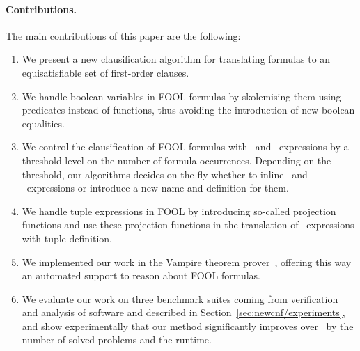 
\paragraph{Contributions.} The main contributions of this paper are the following:
\begin{enumerate}
  \item We present a new clausification algorithm for translating \folb{} formulas to an equisatisfiable set of first-order clauses. 
  \item We handle boolean variables in FOOL formulas by skolemising them using \skolem{} predicates instead of \skolem{} functions, thus avoiding the introduction of new boolean equalities. 
  \item We control the clausification of FOOL formulas with \ITE\ and \LETIN\ expressions by a threshold level on the number of formula occurrences. Depending on the threshold, our algorithms decides on the fly whether to inline \ITE\ and \LETIN\ expressions or introduce a new name and definition for them. 
\item We handle tuple expressions in FOOL by introducing so-called projection functions  and use these projection functions in the translation of \LETIN\ expressions with tuple definition. 
  \item We implemented our work in the Vampire theorem prover~\cite{Vampire13}, 
  offering this way an automated support to reason about FOOL formulas. 
  \item We evaluate our work on three benchmark suites coming from verification
    and analysis of software and described in
    Section~\ref{sec:newcnf/experiments}, and show experimentally that our method
    significantly improves over~\cite{VampireAndFOOL} by the number of solved problems and the runtime.
\end{enumerate}